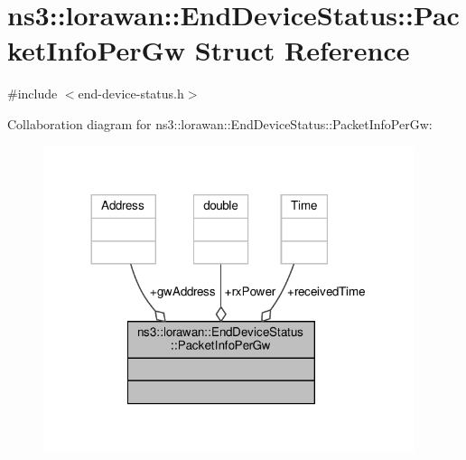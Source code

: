 \hypertarget{structns3_1_1lorawan_1_1EndDeviceStatus_1_1PacketInfoPerGw}{}\section{ns3\+:\+:lorawan\+:\+:End\+Device\+Status\+:\+:Packet\+Info\+Per\+Gw Struct Reference}
\label{structns3_1_1lorawan_1_1EndDeviceStatus_1_1PacketInfoPerGw}


{\ttfamily \#include $<$end-\/device-\/status.\+h$>$}



Collaboration diagram for ns3\+:\+:lorawan\+:\+:End\+Device\+Status\+:\+:Packet\+Info\+Per\+Gw\+:
\nopagebreak
\begin{figure}[H]
\begin{center}
\leavevmode
\includegraphics[width=308pt]{structns3_1_1lorawan_1_1EndDeviceStatus_1_1PacketInfoPerGw__coll__graph}
\end{center}
\end{figure}
